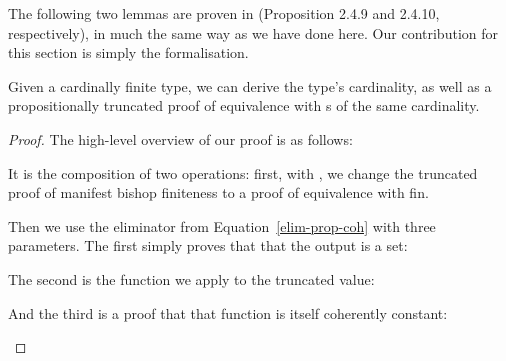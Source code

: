 The following two lemmas are proven in
\cite{yorgeyCombinatorialSpeciesLabelled2014} (Proposition 2.4.9 and 2.4.10,
respectively), in much the same way as we have done here.
Our contribution for this section is simply the formalisation.
\begin{lemma}
  Given a cardinally finite type, we can derive the type's cardinality, as well
  as a propositionally truncated proof of equivalence with s of
  the same cardinality.
  \begin{agdalisting}
  \end{agdalisting}
\end{lemma}
\begin{proof}
  The high-level overview of our proof is as follows:
  \begin{agdalisting}
  \end{agdalisting}
  It is the composition of two operations: first, with
  , we change the truncated
  proof of manifest bishop finiteness to a proof of equivalence with fin.

  Then we use the eliminator from Equation~\ref{elim-prop-coh} with three
  parameters.
  The first simply proves that that the output is a set:
  \begin{agdalisting}
  \end{agdalisting}
  The second is the function we apply to the truncated value:
  \begin{agdalisting}
  \end{agdalisting}
  And the third is a proof that that function is itself coherently constant:
  \begin{agdalisting}
  \end{agdalisting}


\end{proof}
